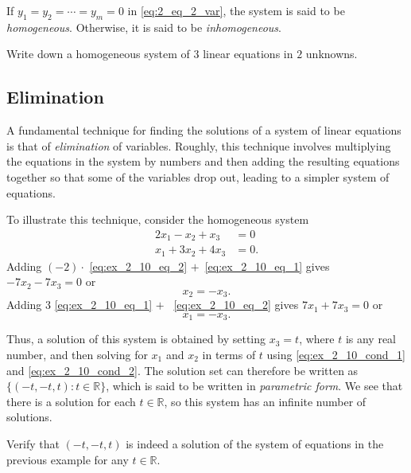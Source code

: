 \documentclass[12pt,letterpaper,reqno]{article}
\numberwithin{equation}{section}
\newcommand{\R}{\ensuremath{\mathbb R}}
\begin{document}
\begin{defn}\label{def:homogeneous_and_inhomogeneous_sytems}
If $y_1=y_2=\cdots=y_m=0$ in 
\eqref{eq:2_eq_2_var}, the system is said to be \emph{homogeneous}. Otherwise, it is said to be \emph{inhomogeneous}.
\end{defn}

\begin{exercise}
	Write down a homogeneous system of $3$ linear equations in $2$ unknowns.
\end{exercise}

\subsection{Elimination}
A fundamental technique for finding the solutions of a system of linear equations is that of \emph{elimination} of variables. Roughly, this technique involves multiplying the equations in the system by numbers and then adding the resulting equations together so that some of the variables drop out, leading to a simpler system of equations.
\begin{example}
To illustrate this technique, consider the homogeneous system
	\begin{align}\label{eq:ex_2_10_eq_1}
		2x_1-x_2+x_3&=0 \\ \label{eq:ex_2_10_eq_2}
		x_1+3x_2+4x_3&=0. 
	\end{align} 
Adding $(-2) \cdot $ \eqref{eq:ex_2_10_eq_2} $+$\ \eqref{eq:ex_2_10_eq_1}  gives $-7x_2-7x_3=0$ or 
\begin{equation}\label{eq:ex_2_10_cond_1}
	x_2=-x_3.
\end{equation}
Adding
$3$ \eqref{eq:ex_2_10_eq_1} $+$ \ \eqref{eq:ex_2_10_eq_2} gives $7x_1+7x_3=0$ or 
\begin{equation}\label{eq:ex_2_10_cond_2}
	x_1=-x_3.
\end{equation}

Thus, a solution of this system is obtained by setting $x_3=t$, where $t$ is any real number, and then solving for $x_1$ and $x_2$ in terms of $t$ using \eqref{eq:ex_2_10_cond_1} and \eqref{eq:ex_2_10_cond_2}. The solution set can therefore be written as $\{(-t,-t,t): t \in \mathbb{R}\}$, which is said to be written in \emph{parametric form}. We see that there is a solution for each $t \in \R$, so this system has an infinite number of solutions.
  \end{example}
 \begin{exercise}\label{ex:verify_is_indeed_solution}
 Verify that $(-t,-t,t)$ is indeed a solution of the system of equations in the previous example for any $t \in \R$.	
 \end{exercise}
\end{document}
